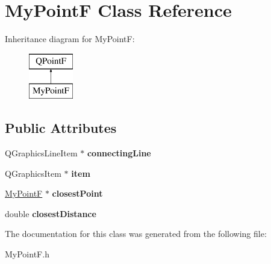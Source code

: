 \hypertarget{class_my_point_f}{}\section{My\+Point\+F Class Reference}
\label{class_my_point_f}
Inheritance diagram for My\+Point\+F\+:\begin{figure}[H]
\begin{center}
\leavevmode
\includegraphics[height=2.000000cm]{class_my_point_f}
\end{center}
\end{figure}
\subsection*{Public Attributes}
\begin{DoxyCompactItemize}
\item 
\hypertarget{class_my_point_f_ad38dddef3e72005d48fac561eaf0fd15}{}Q\+Graphics\+Line\+Item $\ast$ {\bfseries connecting\+Line}\label{class_my_point_f_ad38dddef3e72005d48fac561eaf0fd15}

\item 
\hypertarget{class_my_point_f_a61bd27efc4a2001e5db086e8eba61636}{}Q\+Graphics\+Item $\ast$ {\bfseries item}\label{class_my_point_f_a61bd27efc4a2001e5db086e8eba61636}

\item 
\hypertarget{class_my_point_f_a5206b8bcf9a21c12c9649c21c54e204a}{}\hyperlink{class_my_point_f}{My\+Point\+F} $\ast$ {\bfseries closest\+Point}\label{class_my_point_f_a5206b8bcf9a21c12c9649c21c54e204a}

\item 
\hypertarget{class_my_point_f_a310cc7f9bf6abc5fc5c068aaf1f2c4a0}{}double {\bfseries closest\+Distance}\label{class_my_point_f_a310cc7f9bf6abc5fc5c068aaf1f2c4a0}

\end{DoxyCompactItemize}


The documentation for this class was generated from the following file\+:\begin{DoxyCompactItemize}
\item 
My\+Point\+F.\+h\end{DoxyCompactItemize}
